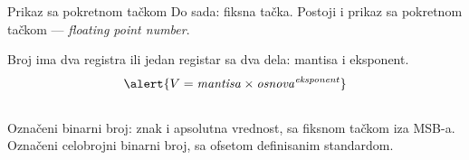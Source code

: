 \begin{frame}[label=04-s039]{Prikaz sa pokretnom tačkom}
Do sada: \alert{fiksna tačka}. Postoji i prikaz sa \alert{pokretnom tačkom} — \textit{floating point number}.\par
Broj ima dva registra ili jedan registar sa dva dela: mantisa i eksponent.
\[\alert{V=\mathit{mantisa}\times\mathit{osnova}^{\mathit{eksponent}}}\]
\begin{columns}[T,onlytextwidth]
Označeni binarni broj: znak i apsolutna vrednost, sa fiksnom tačkom iza MSB-a.
Označeni celobrojni binarni broj, sa ofsetom definisanim standardom.
\end{columns}
\par\vspace{4mm}
\end{frame}
